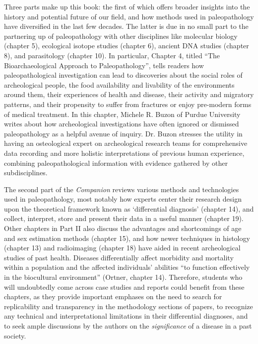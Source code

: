 Three parts make up this book: the first of which offers broader insights into the history and potential future of our field, and how methods used in paleopathology have diversified in the last few decades.
The latter is due in no small part to the partnering up of paleopathology with other disciplines like molecular biology (chapter 5), ecological isotope studies (chapter 6), ancient DNA studies (chapter 8), and parasitology (chapter 10).
In particular, Chapter 4, titled “The Bioarchaeological Approach to Paleopathology”, tells readers how paleopathological investigation can lead to discoveries about the social roles of archeological people, the food availability and livability of the environments around them, their experiences of health and disease, their activity and migratory patterns, and their propensity to suffer from fractures or enjoy pre-modern forms of medical treatment.
In this chapter, Michele R. Buzon of Purdue University writes about how archeological investigations have often ignored or dismissed paleopathology as a helpful avenue of inquiry.
Dr. Buzon stresses the utility in having an osteological expert on archeological research teams for comprehensive data recording and more holistic interpretations of previous human experience, combining paleopathological information with evidence gathered by other subdisciplines.

The second part of the \textit{Companion} reviews various methods and technologies used in paleopathology, most notably how experts center their research design upon the theoretical framework known as ‘differential diagnosis’ (chapter 14), and collect, interpret, store and present their data in a useful manner (chapter 19).
Other chapters in Part II also discuss the advantages and shortcomings of age and sex estimation methods (chapter 15), and how newer techniques in histology (chapter 13) and radioimaging (chapter 18) have aided in recent archeological studies of past health. 
Diseases differentially affect morbidity and mortality within a population and the affected individuals’ abilities “to function effectively in the biocultural environment” (Ortner, chapter 14).
Therefore, students who will undoubtedly come across case studies and reports could benefit from these chapters, as they provide important emphases on the need to search for replicability and transparency in the methodology sections of papers, to recognize any technical and interpretational limitations in their differential diagnoses, and to seek ample discussions by the authors on the \textit{significance} of a disease in a past society.

